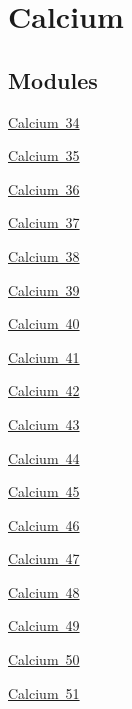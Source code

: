 \hypertarget{group___isotope_const-_calcium}{}\section{Calcium}
\label{group___isotope_const-_calcium}
\subsection*{Modules}
\begin{DoxyCompactItemize}
\item 
\mbox{\hyperlink{group___isotope_const-_calcium-_ca34}{Calcium 34}}
\item 
\mbox{\hyperlink{group___isotope_const-_calcium-_ca35}{Calcium 35}}
\item 
\mbox{\hyperlink{group___isotope_const-_calcium-_ca36}{Calcium 36}}
\item 
\mbox{\hyperlink{group___isotope_const-_calcium-_ca37}{Calcium 37}}
\item 
\mbox{\hyperlink{group___isotope_const-_calcium-_ca38}{Calcium 38}}
\item 
\mbox{\hyperlink{group___isotope_const-_calcium-_ca39}{Calcium 39}}
\item 
\mbox{\hyperlink{group___isotope_const-_calcium-_ca40}{Calcium 40}}
\item 
\mbox{\hyperlink{group___isotope_const-_calcium-_ca41}{Calcium 41}}
\item 
\mbox{\hyperlink{group___isotope_const-_calcium-_ca42}{Calcium 42}}
\item 
\mbox{\hyperlink{group___isotope_const-_calcium-_ca43}{Calcium 43}}
\item 
\mbox{\hyperlink{group___isotope_const-_calcium-_ca44}{Calcium 44}}
\item 
\mbox{\hyperlink{group___isotope_const-_calcium-_ca45}{Calcium 45}}
\item 
\mbox{\hyperlink{group___isotope_const-_calcium-_ca46}{Calcium 46}}
\item 
\mbox{\hyperlink{group___isotope_const-_calcium-_ca47}{Calcium 47}}
\item 
\mbox{\hyperlink{group___isotope_const-_calcium-_ca48}{Calcium 48}}
\item 
\mbox{\hyperlink{group___isotope_const-_calcium-_ca49}{Calcium 49}}
\item 
\mbox{\hyperlink{group___isotope_const-_calcium-_ca50}{Calcium 50}}
\item 
\mbox{\hyperlink{group___isotope_const-_calcium-_ca51}{Calcium 51}}

\end{DoxyCompactItemize}
